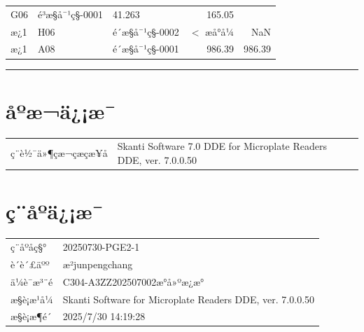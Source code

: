 \documentclass[UTF8,10pt,a4paper,fontset=fandol]{ctexart}
\newcommand{\fieldvalue}[1]{#1}
\begin{document}
\begin{tabularx}{\textwidth}{@{}l l X r r@{}}
\fieldvalue{G06} &
\fieldvalue{é³æ§å¯¹ç§-0001} &
\fieldvalue{41.263} &
\fieldvalue{165.05}
\\
æ¿1 &
\fieldvalue{H06} &
\fieldvalue{é´æ§å¯¹ç§-0002} &
\fieldvalue{$<$ æå°å¼} &
\fieldvalue{NaN}
\\
æ¿1 &
\fieldvalue{A08} &
\fieldvalue{é´æ§å¯¹ç§-0001} &
\fieldvalue{986.39} &
\fieldvalue{986.39}
\end{tabularx}

\bigskip
\hrule
\bigskip

\section*{åºæ¬ä¿¡æ¯}

\begin{tabularx}{\textwidth}{@{}l X@{}}
ç¨è½¯ä»¶çæ¬çæçæ¥å &
\fieldvalue{Skanti Software 7.0 DDE for Microplate Readers DDE, ver. 7.0.0.50}
\end{tabularx}

\section*{ç¨åºä¿¡æ¯}

\begin{tabularx}{\textwidth}{@{}l X@{}}
ç¨åºåç§° &
\fieldvalue{20250730-PGE2-1}
\\
è´è´£äºº &
\fieldvalue{æ²junpengchang}
\\
ä¼è¯æ³¨é &
\fieldvalue{C304-A3ZZ202507002æ°å»ºæ¿æ°}
\\
æ§è¡æ¹å¼ &
\fieldvalue{Skanti Software for Microplate Readers DDE, ver. 7.0.0.50}
\\
æ§è¡æ¶é´ &
\fieldvalue{2025/7/30 14:19:28}
\end{tabularx}
\end{document}
